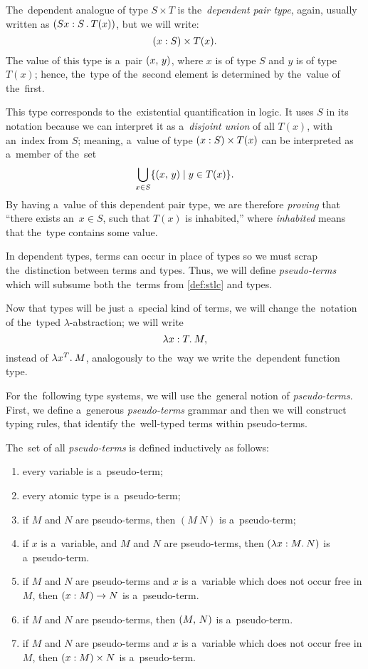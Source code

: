 The~dependent analogue of type $S \times T$ is the~\emph{dependent pair type},
again, usually written as ${(S x \overset{}: S \, . \: T(x))}$, but we will write:
\[
  (x \overset{}: S) \times T(x).
\]
The value of this type is a~pair $(x, \, y)$, where $x$ is of type $S$ and $y$
is of type $T(x)$; hence, the~type of the~second element is determined by
the~value of the~first.

This type corresponds to the~existential quantification in logic. It uses $S$ in
its notation because we can interpret it as a~\emph{disjoint union} of all
$T(x)$, with an~index from $S$; meaning, a~value of type $(x \overset{}: S) \times
T(x)$ can be interpreted as a~member of the~set
\[
  \bigcup_{x \in S} \{ (x, \, y) \mid y \in T(x) \}.
\]
By having a~value of this dependent pair type, we are therefore \emph{proving}
that ``there exists an~$x \in S$, such that $T(x)$ is inhabited,'' where
\emph{inhabited} means that the~type contains some value.

In dependent types, terms can occur in place of types so we must scrap
the~distinction between terms and types. Thus, we will define
\emph{pseudo-terms} which will subsume both the~terms from \autoref{def:stlc}
and types.

Now that types will be just a~special kind of terms, we will change the~notation
of the~typed $\lambda$-abstraction; we will write
\[
  \lambda x \overset{}: T . \: M,
\]
instead of $\lambda x^T . \: M$, analogously to the~way we write the~dependent
function type.


For the~following type systems, we will use the~general notion of
\emph{pseudo-terms}. First, we define a~generous \emph{pseudo-terms} grammar and
then we will construct typing rules, that identify the~well-typed terms within
pseudo-terms.

\begin{definition}\label{def:pseudo-term}
  The~set of all \emph{pseudo-terms} is defined inductively as follows:
  \begin{enumerate}
    \item every variable is a~pseudo-term;
    \item every atomic type is a~pseudo-term;
    \item if $M$ and $N$ are pseudo-terms, then $(M \: N)$ is a~pseudo-term;
    \item if $x$ is a~variable, and $M$ and $N$ are pseudo-terms, then
      $(\lambda x \overset{}: M . \: N)$ is a~pseudo-term.
    \item if $M$ and $N$ are pseudo-terms and $x$ is a~variable which does not
      occur free in $M$, then $(x : M) \to N$ is a~pseudo-term.
    \item if $M$ and $N$ are pseudo-terms, then $(M, \, N)$ is a~pseudo-term.
    \item if $M$ and $N$ are pseudo-terms and $x$ is a~variable which does not
      occur free in $M$, then $(x \overset{}: M) \times N$ is a~pseudo-term.
  \end{enumerate}
\end{definition}

